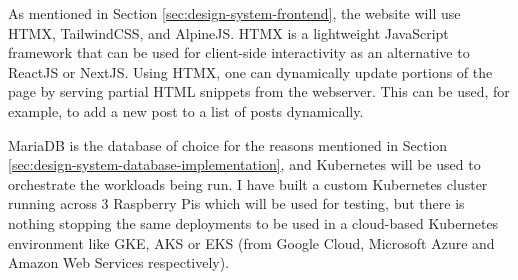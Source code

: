 As mentioned in Section \ref{sec:design-system-frontend}, the website will use HTMX, TailwindCSS, and AlpineJS. HTMX is a lightweight JavaScript framework that can be used for client-side interactivity as an alternative to ReactJS or NextJS.
Using HTMX, one can dynamically update portions of the page by serving partial HTML snippets from the webserver. This can be used, for example, to add a new post to a list of posts dynamically.

MariaDB is the database of choice for the reasons mentioned in Section \ref{sec:design-system-database-implementation}, and Kubernetes will be used to orchestrate the workloads being run. I have built a custom Kubernetes cluster running across 3 Raspberry Pis which will be used for testing, but there is nothing stopping the same deployments to be used in a cloud-based Kubernetes environment like GKE, AKS or EKS (from Google Cloud, Microsoft Azure and Amazon Web Services respectively).
